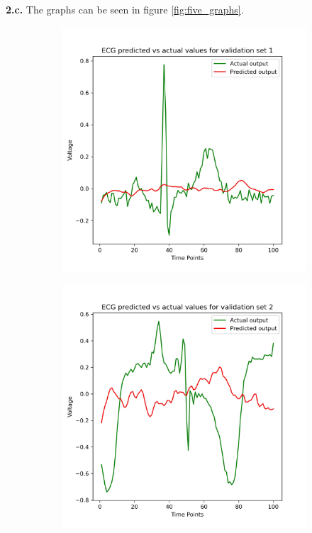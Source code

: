 \documentclass[11pt]{article}
\begin{document}
\textbf{2.c.} The graphs can be seen in figure \ref{fig:five_graphs}.
\begin{figure}
	\centering
	\begin{subfigure}[b]{0.18\textwidth}
		\centering
		\includegraphics[width=\textwidth]{prediction_plot_1.jpg}
		\label{fig:val_pred_given_nn_1}
	\end{subfigure}
	\begin{subfigure}[b]{0.18\textwidth}
		\centering
		\includegraphics[width=\textwidth]{prediction_plot_2.jpg}

\end{subfigure}
\end{figure}
\end{document}
